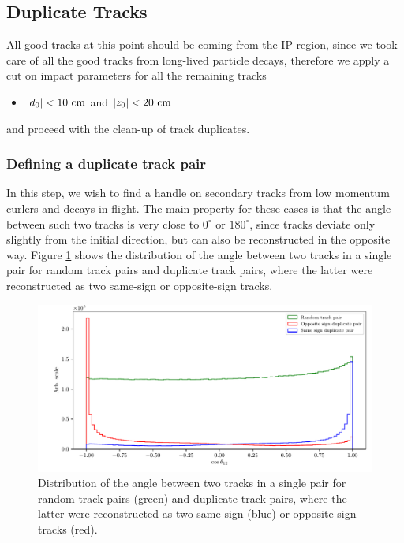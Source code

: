 \subsection{Duplicate Tracks}
All good tracks at this point should be coming from the IP region, since we took care of all the good tracks from long-lived particle decays, therefore we apply a cut on impact parameters for all the remaining tracks
\begin{itemize}
	\item $\vert d_0 \vert < 10\mathrm{~cm}$ and $\vert z_0 \vert < 20\mathrm{~cm}$
\end{itemize} 

and proceed with the clean-up of track duplicates.

\subsubsection{Defining a duplicate track pair}

In this step, we wish to find a handle on secondary tracks from low momentum curlers and decays in flight. The main property for these cases is that the angle between such two tracks is very close to $0^\circ$ or $180^\circ$, since tracks deviate only slightly from the initial direction, but can also be reconstructed in the opposite way. Figure \ref{fig:ROE_dupAngleInit} shows the distribution of the angle between two tracks in a single pair for random track pairs and duplicate track pairs, where the latter were reconstructed as two same-sign or opposite-sign tracks.

\begin{figure}[H]
	\centering
	\captionsetup{width=0.8\linewidth}
	\includegraphics[width=\linewidth]{fig/ROECleanup_dup_angle_initial}
	\caption{Distribution of the angle between two tracks in a single pair for random track pairs (green) and duplicate track pairs, where the latter were reconstructed as two same-sign (blue) or opposite-sign tracks (red).}
	\label{fig:ROE_dupAngleInit}
\end{figure}

